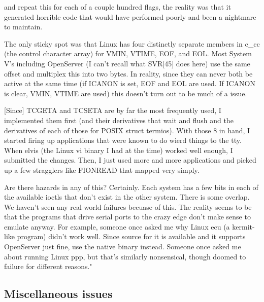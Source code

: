 \documentclass[letterpaper]{article}
\begin{document}
and repeat this for each of a couple hundred flags, the reality was that
it generated horrible code that would have performed poorly and been
a nightmare to maintain. 

The only sticky spot was that Linux has four distinctly separate
members in c\_cc (the control character array) for VMIN, VTIME, EOF, 
and EOL. Most System V's including OpenServer (I can't recall what SVR[45] 
does here) use the same offset and multiplex this into two bytes. In reality, 
since they can never both be active at the same time (if ICANON is set, EOF 
and EOL are used. If ICANON is clear, VMIN, VTIME are used) this doesn't turn
out to be much of a issue.

[Since] TCGETA and TCSETA are by far the most frequently used, I implemented 
them first (and their derivatives that wait and flush and the derivatives of 
each of those for POSIX struct termios). With those 8 in hand, I started firing 
up applications that were known to do wierd things to the tty. When elvis 
(the Linux vi binary I had at the time) worked well enough, I submitted the 
changes. Then, I just used more and more applications and picked up a few 
stragglers like FIONREAD that mapped very simply. 

Are there hazards in any of this? Certainly. Each system has a few
bits in each of the available ioctls that don't exist in the other
system. There is some overlap. We haven't seen any real world
failures becuase of this. The reality seems to be that the programs
that drive serial ports to the crazy edge don't make sense to emulate
anyway. For example, someone once asked me why Linux ecu (a kermit-like
program) didn't work well. Since source for it is available and it
supports OpenServer just fine, use the native binary instead. Someone
once asked me about running Linux ppp, but that's similarly nonsensical,
though doomed to failure for different reasons."




\subsection{Miscellaneous issues}
\end{document}
